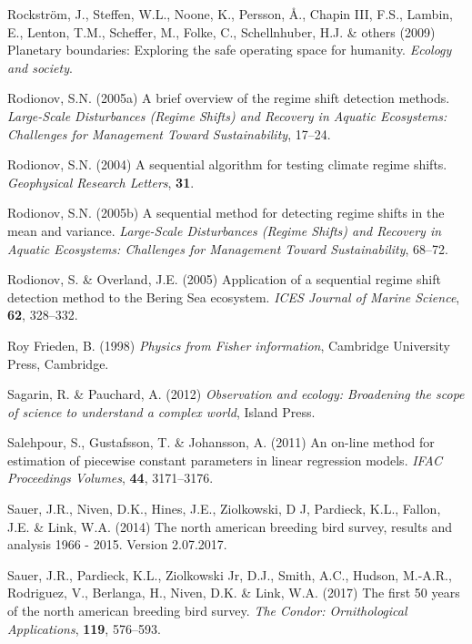 \documentclass[12pt,twoside,openany]{reedthesis}
\begin{document}
\leavevmode\hypertarget{ref-rockstrom_planetary_2009}{}%
Rockström, J., Steffen, W.L., Noone, K., Persson, Å., Chapin III, F.S., Lambin, E., Lenton, T.M., Scheffer, M., Folke, C., Schellnhuber, H.J. \& others (2009) Planetary boundaries: Exploring the safe operating space for humanity. \emph{Ecology and society}.

\leavevmode\hypertarget{ref-rodionov_brief_2005}{}%
Rodionov, S.N. (2005a) A brief overview of the regime shift detection methods. \emph{Large-Scale Disturbances (Regime Shifts) and Recovery in Aquatic Ecosystems: Challenges for Management Toward Sustainability}, 17--24.

\leavevmode\hypertarget{ref-rodionov2004sequential}{}%
Rodionov, S.N. (2004) A sequential algorithm for testing climate regime shifts. \emph{Geophysical Research Letters}, \textbf{31}.

\leavevmode\hypertarget{ref-rodionov_sequential_2005}{}%
Rodionov, S.N. (2005b) A sequential method for detecting regime shifts in the mean and variance. \emph{Large-Scale Disturbances (Regime Shifts) and Recovery in Aquatic Ecosystems: Challenges for Management Toward Sustainability}, 68--72.

\leavevmode\hypertarget{ref-rodionov_application_2005}{}%
Rodionov, S. \& Overland, J.E. (2005) Application of a sequential regime shift detection method to the Bering Sea ecosystem. \emph{ICES Journal of Marine Science}, \textbf{62}, 328--332.

\leavevmode\hypertarget{ref-frieden_physics_1998}{}%
Roy Frieden, B. (1998) \emph{Physics from Fisher information}, Cambridge University Press, Cambridge.

\leavevmode\hypertarget{ref-sagarin_observation_2012}{}%
Sagarin, R. \& Pauchard, A. (2012) \emph{Observation and ecology: Broadening the scope of science to understand a complex world}, Island Press.

\leavevmode\hypertarget{ref-salehpour2011line}{}%
Salehpour, S., Gustafsson, T. \& Johansson, A. (2011) An on-line method for estimation of piecewise constant parameters in linear regression models. \emph{IFAC Proceedings Volumes}, \textbf{44}, 3171--3176.

\leavevmode\hypertarget{ref-sauer2017results}{}%
Sauer, J.R., Niven, D.K., Hines, J.E., Ziolkowski, D J, Pardieck, K.L., Fallon, J.E. \& Link, W.A. (2014) The north american breeding bird survey, results and analysis 1966 - 2015. Version 2.07.2017.

\leavevmode\hypertarget{ref-sauer2017first}{}%
Sauer, J.R., Pardieck, K.L., Ziolkowski Jr, D.J., Smith, A.C., Hudson, M.-A.R., Rodriguez, V., Berlanga, H., Niven, D.K. \& Link, W.A. (2017) The first 50 years of the north american breeding bird survey. \emph{The Condor: Ornithological Applications}, \textbf{119}, 576--593.
\end{document}
